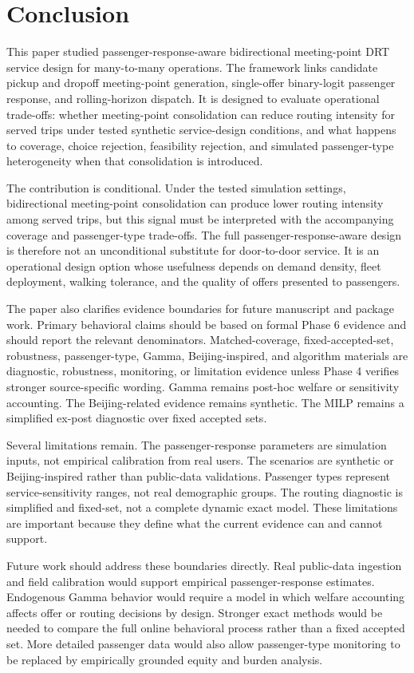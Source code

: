 \section{Conclusion}
\label{sec:conclusion}

This paper studied passenger-response-aware bidirectional meeting-point DRT service
design for many-to-many operations. The framework links candidate pickup and dropoff
meeting-point generation, single-offer binary-logit passenger response, and
rolling-horizon dispatch. It is designed to evaluate operational trade-offs: whether
meeting-point consolidation can reduce routing intensity for served trips under tested
synthetic service-design conditions, and what happens to coverage, choice rejection,
feasibility rejection, and simulated passenger-type heterogeneity when that
consolidation is introduced.

The contribution is conditional. Under the tested simulation settings,
bidirectional meeting-point consolidation can produce lower routing intensity among
served trips, but this signal must be interpreted with the accompanying coverage and
passenger-type trade-offs. The full passenger-response-aware design is therefore not an
unconditional substitute for door-to-door service. It is an operational design option whose
usefulness depends on demand density, fleet deployment, walking tolerance, and the
quality of offers presented to passengers.

The paper also clarifies evidence boundaries for future manuscript and package work.
Primary behavioral claims should be based on formal Phase 6 evidence and should report
the relevant denominators. Matched-coverage, fixed-accepted-set, robustness,
passenger-type, Gamma, Beijing-inspired, and algorithm materials are diagnostic,
robustness, monitoring, or limitation evidence unless Phase 4 verifies stronger
source-specific wording. Gamma remains post-hoc welfare or sensitivity accounting. The
Beijing-related evidence remains synthetic. The MILP remains a simplified ex-post
diagnostic over fixed accepted sets.

Several limitations remain. The passenger-response parameters are simulation inputs, not
empirical calibration from real users. The scenarios are synthetic or Beijing-inspired
rather than public-data validations. Passenger types represent service-sensitivity
ranges, not real demographic groups. The routing diagnostic is simplified and fixed-set,
not a complete dynamic exact model. These limitations are important because they define
what the current evidence can and cannot support.

Future work should address these boundaries directly. Real public-data ingestion and
field calibration would support empirical passenger-response estimates. Endogenous
Gamma behavior would require a model in which welfare accounting affects offer or
routing decisions by design. Stronger exact methods would be needed to compare the full
online behavioral process rather than a fixed accepted set. More detailed passenger data
would also allow passenger-type monitoring to be replaced by empirically grounded
equity and burden analysis.
